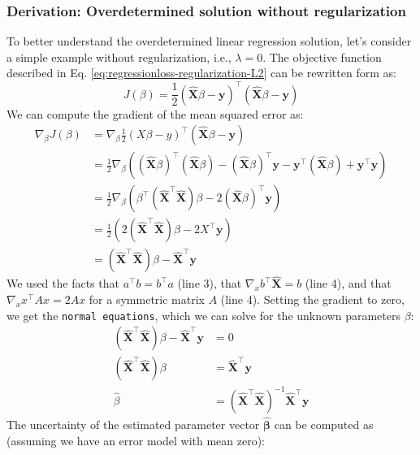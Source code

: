 \documentclass{article}[11pt]
\begin{document}
\subsubsection*{Derivation: Overdetermined solution without regularization}
To better understand the overdetermined linear regression solution, let's consider a simple example without regularization, i.e., $\lambda=0$. The objective function described in Eq. \ref{eq:regressionloss-regularization-L2} can be rewritten form as:
\begin{equation}\label{eq:regressionloss-regularization-L2-2}
J(\beta) = \frac{1}{2}(\hat{\mathbf{X}} \beta - \mathbf{y})^\top  (\hat{\mathbf{X}} \beta - \mathbf{y})
\end{equation}
We can compute the gradient of the mean squared error as:
\begin{align*}
\nabla_\beta J(\beta) 
& = \nabla_\beta \frac{1}{2} (X \beta - y)^\top  (\hat{\mathbf{X}} \beta - \mathbf{y}) \\
& = \frac{1}{2} \nabla_\beta \left( (\hat{\mathbf{X}} \beta)^\top  (\hat{\mathbf{X}} \beta) - (\hat{\mathbf{X}} \beta)^\top \mathbf{y} - \mathbf{y}^\top (\hat{\mathbf{X}} \beta) + \mathbf{y}^\top \mathbf{y} \right) \\
& = \frac{1}{2} \nabla_\beta \left( \beta^\top  (\hat{\mathbf{X}}^\top \hat{\mathbf{X}}) \beta - 2(\hat{\mathbf{X}} \beta)^\top \mathbf{y} \right) \\
& = \frac{1}{2} \left( 2(\hat{\mathbf{X}}^\top \hat{\mathbf{X}}) \beta - 2X^\top \mathbf{y} \right) \\
& = (\hat{\mathbf{X}}^\top \hat{\mathbf{X}}) \beta - \hat{\mathbf{X}}^\top \mathbf{y}
\end{align*}
We used the facts that $a^\top b = b^\top a$ (line 3), that $\nabla_x b^\top \hat{\mathbf{X}} = b$ (line 4), and that $\nabla_x x^\top A x = 2 A x$ for a symmetric matrix $A$ (line 4).
Setting the gradient to zero, we get the \texttt{normal equations}, which we can solve for the unknown parameters $\beta$:
\begin{align*}
(\hat{\mathbf{X}}^\top \hat{\mathbf{X}}) \beta - \hat{\mathbf{X}}^\top \mathbf{y} 
& = 0 \\
(\hat{\mathbf{X}}^\top \hat{\mathbf{X}}) \beta 
& = \hat{\mathbf{X}}^\top \mathbf{y} \\
\hat{\beta} 
& = (\hat{\mathbf{X}}^\top \hat{\mathbf{X}})^{-1} \hat{\mathbf{X}}^\top \mathbf{y}
\end{align*}
The uncertainty of the estimated parameter vector $\hat{\mathbf{\beta}}$ can be computed as (assuming we have an error model with mean zero):
\end{document}
